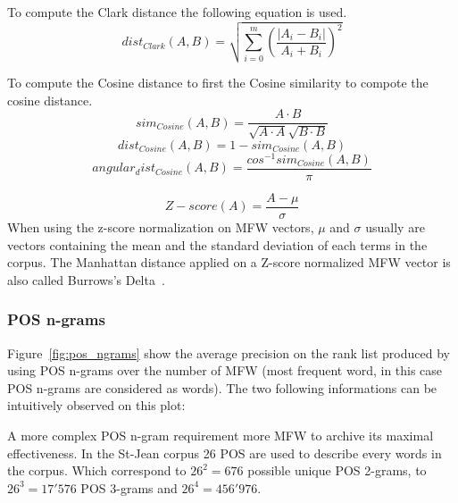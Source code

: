 \begin{definition}
  To compute the Clark distance the following equation is used.
  \begin{equation}
    dist_{Clark}(A, B) = \sqrt{\sum_{i=0}^{m}\left(\frac{|A_i - B_i|}{A_i + B_i}\right)^2}
  \end{equation}
\end{definition}

\begin{definition}
  To compute the Cosine distance to first the Cosine similarity to compote the cosine distance.
  \begin{equation}
    sim_{Cosine}(A, B) = \frac{A \cdot B}{\sqrt{A \cdot A}\sqrt{B \cdot B}}
  \end{equation}
  \begin{equation}
    dist_{Cosine}(A, B) = 1 - sim_{Cosine}(A, B)
  \end{equation}
  \begin{equation}
    angular_dist_{Cosine}(A, B) = \frac{cos^{-1}sim_{Cosine}(A, B)}{\pi}
  \end{equation}
\end{definition}

\begin{definition}
  \begin{equation}
    Z-score(A) = \frac{A - \mu}{\sigma}
  \end{equation}
  When using the z-score normalization on MFW vectors, $\mu$ and $\sigma$ usually are vectors containing the mean and the standard deviation of each terms in the corpus.
  The Manhattan distance applied on a Z-score normalized MFW vector is also called Burrows's Delta~\cite{savoy_stylo}.
\end{definition}


\subsubsection{POS n-grams}

Figure~\ref{fig:pos_ngrams} show the average precision on the rank list produced by using POS n-grams over the number of MFW (most frequent word, in this case POS n-grams are considered as words).
The two following informations can be intuitively observed on this plot:

A more complex POS n-gram requirement more MFW to archive its maximal effectiveness.
In the St-Jean corpus 26 POS are used to describe every words in the corpus.
Which correspond to $26^2 = 676$ possible unique POS 2-grams, to $26^3 = 17'576$ POS 3-grams and $26^4 = 456'976$.

